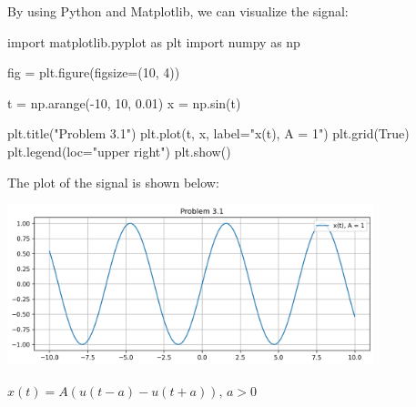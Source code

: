 \documentclass[a4paper, 10pt]{article}
\begin{document}
\begin{solution}
\vspace{2mm}

By using Python and Matplotlib, we can visualize the signal:
\begin{codingbox}
import matplotlib.pyplot as plt
import numpy as np

fig = plt.figure(figsize=(10, 4))

t = np.arange(-10, 10, 0.01)
x = np.sin(t)

plt.title("Problem 3.1")
plt.plot(t, x, label="x(t), A = 1")
plt.grid(True)
plt.legend(loc="upper right")
plt.show()
\end{codingbox}

\newpage

The plot of the signal is shown below:
\begin{center}
    \includegraphics[width=0.8\textwidth]{images/problem_3_1.png}
\end{center}
\end{solution}


\begin{subproblems}[start=2]
    \item \( x(t) = A(u(t-a) - u(t+a)), \, a > 0 \)
\end{subproblems}
\end{document}
